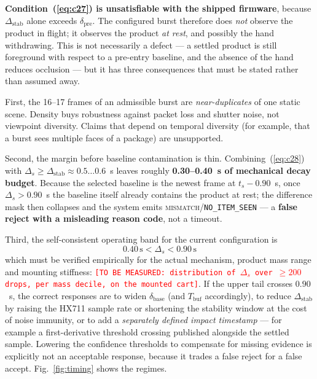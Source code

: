 \documentclass[conference]{IEEEtran}
\newcommand{\tbm}[1]{\textcolor{red}{\texttt{[TO BE MEASURED: #1]}}}
\begin{document}
\textbf{Condition~(\ref{eq:c27}) is unsatisfiable with the shipped firmware}, because
$\Delta_{\mathrm{stab}}$ alone exceeds $\delta_{\mathrm{pre}}$. The configured burst therefore does
\emph{not} observe the product in flight; it observes the product \emph{at rest}, and possibly the
hand withdrawing. This is not necessarily a defect --- a settled product is still foreground with
respect to a pre-entry baseline, and the absence of the hand reduces occlusion --- but it has three
consequences that must be stated rather than assumed away.

First, the 16--17 frames of an admissible burst are \emph{near-duplicates} of one static scene.
Density buys robustness against packet loss and shutter noise, not viewpoint diversity. Claims that
depend on temporal diversity (for example, that a burst sees multiple faces of a package) are
unsupported.

Second, the margin before baseline contamination is thin. Combining~(\ref{eq:c28}) with
$\Delta_s \ge \Delta_{\mathrm{stab}} \approx 0.5\ldots0.6$~s leaves roughly \textbf{0.30--0.40~s of
mechanical decay budget}. Because the selected baseline is the newest frame at $t_s-0.90$~s, once
$\Delta_s>0.90$~s the baseline itself already contains the product at rest; the difference mask then
collapses and the system emits \textsc{mismatch}/\texttt{NO\_ITEM\_SEEN} --- a \textbf{false reject
with a misleading reason code}, not a timeout.

Third, the self-consistent operating band for the current configuration is
\begin{equation}
0.40\,\mathrm{s} < \Delta_s < 0.90\,\mathrm{s}
\label{eq:band}
\end{equation}
which must be verified empirically for the actual mechanism, product mass range and mounting
stiffness: \tbm{distribution of $\Delta_s$ over $\ge200$ drops, per mass decile, on the mounted
cart}. If the upper tail crosses $0.90$~s, the correct responses are to widen $\delta_{\mathrm{base}}$
(and $T_{\mathrm{buf}}$ accordingly), to reduce $\Delta_{\mathrm{stab}}$ by raising the HX711 sample
rate or shortening the stability window at the cost of noise immunity, or to add a \emph{separately
defined impact timestamp} --- for example a first-derivative threshold crossing published alongside the
settled sample. Lowering the confidence thresholds to compensate for missing evidence is explicitly
not an acceptable response, because it trades a false reject for a false accept. Fig.~\ref{fig:timing}
shows the regimes.
\end{document}
